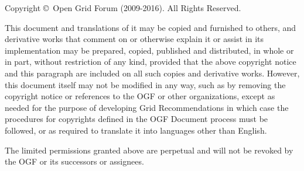 Copyright \copyright ~Open Grid Forum (2009-2016). All Rights Reserved.

This document and translations of it may be copied and furnished to
others, and derivative works that comment on or otherwise explain it
or assist in its implementation may be prepared, copied, published and
distributed, in whole or in part, without restriction of any kind,
provided that the above copyright notice and this paragraph are
included on all such copies and derivative works. However, this
document itself may not be modified in any way, such as by removing
the copyright notice or references to the OGF or other organizations,
except as needed for the purpose of developing Grid Recommendations in
which case the procedures for copyrights defined in the OGF Document
process must be followed, or as required to translate it into
languages other than English.

The limited permissions granted above are perpetual and will not be
revoked by the OGF or its successors or assignees.
